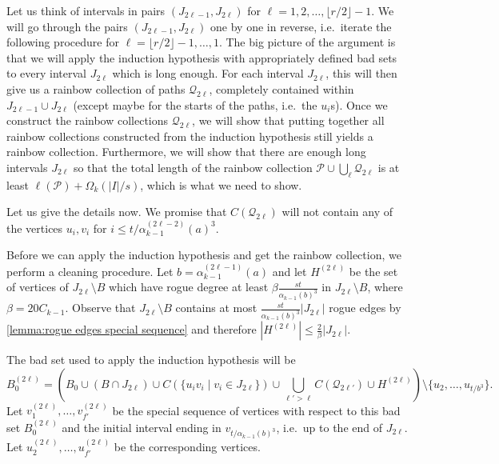 \documentclass[a4paper,11pt]{article}
\makeatletter
\renewenvironment{proof}[1][\proofname] {\par\pushQED{\qed}\normalfont\topsep6\p@\@plus6\p@\relax\trivlist\item[\hskip\labelsep\bfseries#1\@addpunct{.}]\ignorespaces}{\popQED\endtrivlist\@endpefalse}
\theoremstyle{definition}
\def\cP{\mathcal{P}}
\def\cQ{\mathcal{Q}}
\makeatother
\begin{document}
\begin{proof}
Let us think of intervals in pairs $(J_{2\ell-1}, J_{2\ell})$ for $\ell=1, 2, \dots, \lfloor r/2\rfloor-1$. We will go through the pairs $(J_{2\ell-1}, J_{2\ell})$ one by one in reverse, i.e.\ iterate the following procedure for $\ell=\lfloor r/2\rfloor-1, \dots, 1$. The big picture of the argument is that we will apply the induction hypothesis with appropriately defined bad sets to every interval $J_{2\ell}$ which is long enough. For each interval $J_{2\ell}$, this will then give us a rainbow collection of paths $\cQ_{2\ell}$, completely contained within $J_{2\ell-1}\cup J_{2\ell}$ (except maybe for the starts of the paths, i.e.\ the $u_i$s). Once we construct the rainbow collections $\cQ_{2\ell}$, we will show that putting together all rainbow collections constructed from the induction hypothesis still yields a rainbow collection. Furthermore, we will show that there are enough long intervals $J_{2\ell}$ so that the total length of the rainbow collection $\cP\cup\bigcup_\ell \cQ_{2\ell}$ is at least ${\ell(\cP)+}\Omega_k(|I|/s)$, which is what we need to show.

Let us give the details now. We promise that $C(\cQ_{2\ell})$ will not contain any of the vertices $u_i, v_i$ for $i\leq t/\alpha^{(2\ell-2)}_{k-1}(a)^3$.

Before we can apply the induction hypothesis and get the rainbow collection, we perform a cleaning procedure. Let $b=\alpha_{k-1}^{(2\ell-1)}(a)$ and let $H^{(2\ell)}$ be the set of vertices of $J_{2\ell}\setminus B$ which have rogue degree at least $\beta\frac{st}{\alpha_{k-1}(b)^3}$ in $J_{2\ell}\setminus B$, where $\beta=20C_{k-1}$. Observe that $J_{2\ell}\setminus B$ contains at most $\frac{st}{\alpha_{k-1}(b)^3}|J_{2\ell}|$ rogue edges by \cref{lemma:rogue edges special sequence} and therefore $|H^{(2\ell)}|\leq \frac{2}{\beta}|J_{2\ell}|$.

The bad set used to apply the induction hypothesis will be
\[B^{(2\ell)}_0 = \left(B_0 \cup (B\cap J_{2\ell}) \cup C(\{u_iv_i\mid v_i\in J_{2\ell}\})\cup \bigcup_{\ell'>\ell} C(\cQ_{2\ell'})\cup H^{(2\ell)}\right)\setminus\{u_2, \dots, u_{t/b^3}\}.\] 
Let $v_1^{(2\ell)}, \dots, v_{f'}^{(2\ell)}$ be the special sequence of vertices with respect to this bad set $B^{(2\ell)}_0$ and the initial interval ending in $v_{t/\alpha_{k-1}(b)^3}$, i.e.\ up to the end of $J_{2\ell}$. Let $u_2^{(2\ell)},\dots,u_{f'}^{(2\ell)}$ be the corresponding vertices. 


\end{proof}
\end{document}
